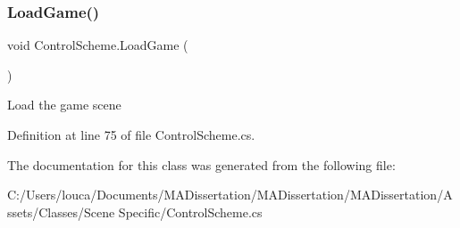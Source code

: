 \subsubsection{\texorpdfstring{Load\+Game()}{LoadGame()}}
{\footnotesize\ttfamily void Control\+Scheme.\+Load\+Game (\begin{DoxyParamCaption}{ }\end{DoxyParamCaption})}



Load the game scene 



Definition at line 75 of file Control\+Scheme.\+cs.



The documentation for this class was generated from the following file\+:\begin{DoxyCompactItemize}
\item 
C\+:/\+Users/louca/\+Documents/\+M\+A\+Dissertation/\+M\+A\+Dissertation/\+M\+A\+Dissertation/\+Assets/\+Classes/\+Scene Specific/Control\+Scheme.\+cs\end{DoxyCompactItemize}
